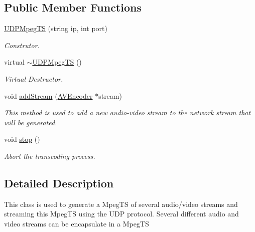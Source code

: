 \subsection*{Public Member Functions}
\begin{DoxyCompactItemize}
\item 
\hyperlink{classbr_1_1ufscar_1_1lince_1_1streaming_1_1UDPMpegTS_a4bb698eefa459f445938a822a2eb1a8f}{UDPMpegTS} (string ip, int port)
\begin{DoxyCompactList}\small\item\em Construtor. \item\end{DoxyCompactList}\item 
virtual \hyperlink{classbr_1_1ufscar_1_1lince_1_1streaming_1_1UDPMpegTS_a806c474fe20b34b899bd048da6997bb2}{$\sim$UDPMpegTS} ()
\begin{DoxyCompactList}\small\item\em Virtual Destructor. \item\end{DoxyCompactList}\item 
void \hyperlink{classbr_1_1ufscar_1_1lince_1_1streaming_1_1UDPMpegTS_a8dc5c2ece80e7cf6c94e10582b78de40}{addStream} (\hyperlink{classbr_1_1ufscar_1_1lince_1_1streaming_1_1AVEncoder}{AVEncoder} $\ast$stream)
\begin{DoxyCompactList}\small\item\em This method is used to add a new audio-\/video stream to the network stream that will be generated. \item\end{DoxyCompactList}\item 
void \hyperlink{classbr_1_1ufscar_1_1lince_1_1streaming_1_1UDPMpegTS_a38862cf512770e1a94df17d013744646}{stop} ()
\begin{DoxyCompactList}\small\item\em Abort the transcoding process. \item\end{DoxyCompactList}\end{DoxyCompactItemize}


\subsection{Detailed Description}
This class is used to generate a MpegTS of several audio/video streams and streaming this MpegTS using the UDP protocol. Several different audio and video streams can be encapsulate in a MpegTS 

